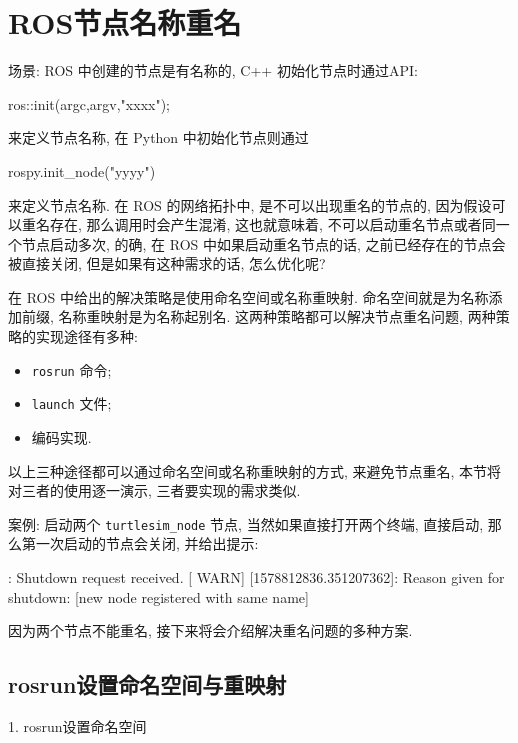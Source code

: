 \documentclass[openany, fontset=windowsold]{ctexbook}
\theoremstyle{kaiti}
\theoremstyle{normal}
\begin{document}
\section{ROS节点名称重名}

场景: ROS 中创建的节点是有名称的, C++ 初始化节点时通过API: 

\begin{cpp}
  ros::init(argc,argv,"xxxx");
\end{cpp}

来定义节点名称, 在 Python 中初始化节点则通过 

\begin{python}
  rospy.init_node("yyyy")
\end{python}

来定义节点名称. 在 ROS 的网络拓扑中, 是不可以出现重名的节点的, 因为假设可以重名存在, 那么调用时会产生混淆, 这也就意味着, 不可以启动重名节点或者同一个节点启动多次, 的确, 在 ROS 中如果启动重名节点的话, 之前已经存在的节点会被直接关闭, 但是如果有这种需求的话, 怎么优化呢?

在 ROS 中给出的解决策略是使用命名空间或名称重映射. 命名空间就是为名称添加前缀, 名称重映射是为名称起别名. 这两种策略都可以解决节点重名问题, 两种策略的实现途径有多种:

\begin{itemize}
  \item \verb|rosrun| 命令;
  \item \verb|launch| 文件;
  \item 编码实现.
\end{itemize}

以上三种途径都可以通过命名空间或名称重映射的方式, 来避免节点重名, 本节将对三者的使用逐一演示, 三者要实现的需求类似.

案例: 启动两个 \verb|turtlesim_node| 节点, 当然如果直接打开两个终端, 直接启动, 那么第一次启动的节点会关闭, 并给出提示:

\begin{bash}
  [ WARN] [1578812836.351049332]: Shutdown request received.
  [ WARN] [1578812836.351207362]: Reason given for shutdown: [new node registered with same name]
\end{bash}

因为两个节点不能重名, 接下来将会介绍解决重名问题的多种方案.

\subsection{rosrun设置命名空间与重映射}

1. rosrun设置命名空间
\end{document}
